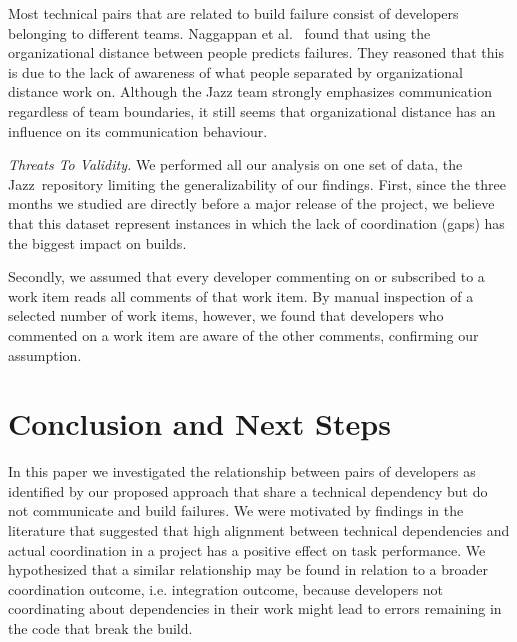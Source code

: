 \documentclass[conference]{IEEEtran}
\begin{document}
Most technical pairs that are related to build failure consist of developers belonging to
different teams. Naggappan et al.~\cite{nagappan:icse:2008} found that using the
organizational distance between people predicts failures. They reasoned that this
is due to the lack of awareness of what people separated by organizational distance
work on. Although the Jazz team strongly emphasizes communication
regardless of team boundaries, it still seems that organizational distance has
an influence on its communication behaviour.

\emph{Threats To Validity.}
\label{sec:threats}
We performed all our analysis on one set of data, the Jazz\texttrademark\
repository limiting  the generalizability of our findings.
First, since the three months  we studied are directly before a major release of the project, 
we believe that this dataset represent instances in which the lack of coordination (gaps) has the biggest impact on builds.

Secondly, we assumed that every developer commenting on or subscribed to a work item reads all comments of that work item. 
By manual inspection of a selected number of work items, however, we found that developers who commented on a work item are aware of the other comments, confirming our assumption.



\section{Conclusion and Next Steps}
In this paper we investigated the relationship between pairs of developers as identified by our proposed approach that share
a technical dependency but do not communicate and build failures. We were
motivated by findings in the literature that suggested that high alignment between technical dependencies and actual coordination in a project has a positive effect on task
performance.
We hypothesized that a similar relationship may be found in relation to a broader
coordination outcome, i.e. integration outcome, because developers not
coordinating about dependencies in their work might lead to errors remaining in
the code that break the build.
\end{document}
